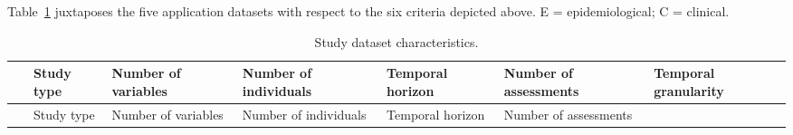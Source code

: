 \documentclass[
]{book}
\begin{document}
Table~\ref{tab:data} juxtaposes the five application datasets with respect to the six criteria depicted above. E = epidemiological; C = clinical.

\begin{longtable}[]{@{}lllllll@{}}
\caption{\label{tab:data} Study dataset characteristics.}\tabularnewline
\toprule
\begin{minipage}[b]{0.08\columnwidth}\raggedright
~\strut
\end{minipage} & \begin{minipage}[b]{0.05\columnwidth}\raggedright
Study type\strut
\end{minipage} & \begin{minipage}[b]{0.13\columnwidth}\raggedright
Number of variables\strut
\end{minipage} & \begin{minipage}[b]{0.13\columnwidth}\raggedright
Number of individuals\strut
\end{minipage} & \begin{minipage}[b]{0.13\columnwidth}\raggedright
Temporal horizon\strut
\end{minipage} & \begin{minipage}[b]{0.13\columnwidth}\raggedright
Number of assessments\strut
\end{minipage} & \begin{minipage}[b]{0.13\columnwidth}\raggedright
Temporal granularity\strut
\end{minipage}\tabularnewline
\midrule
\endfirsthead
\toprule
\begin{minipage}[b]{0.08\columnwidth}\raggedright
~\strut
\end{minipage} & \begin{minipage}[b]{0.05\columnwidth}\raggedright
Study type\strut
\end{minipage} & \begin{minipage}[b]{0.13\columnwidth}\raggedright
Number of variables\strut
\end{minipage} & \begin{minipage}[b]{0.13\columnwidth}\raggedright
Number of individuals\strut
\end{minipage} & \begin{minipage}[b]{0.13\columnwidth}\raggedright
Temporal horizon\strut
\end{minipage} & \begin{minipage}[b]{0.13\columnwidth}\raggedright
Number of assessments\strut
\end{minipage} & \begin{minipage}[b]{0.13\columnwidth}\raggedright

\end{minipage}
\end{longtable}
\end{document}
